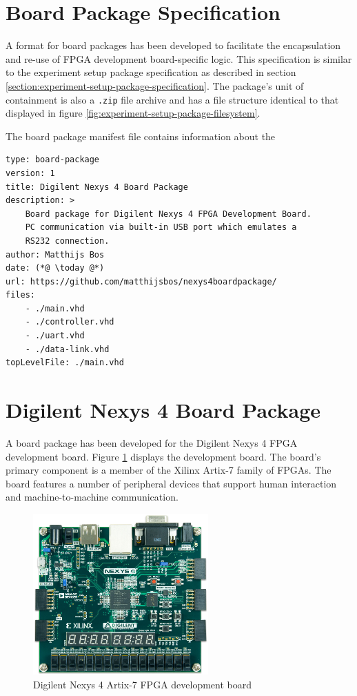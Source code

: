 \documentclass[main.tex]{subfiles}
\begin{document}
\section{Board Package Specification}
A format for board packages has been developed to facilitate the encapsulation and re-use of FPGA development board-specific logic. This specification is similar to the experiment setup package specification as described in section \ref{section:experiment-setup-package-specification}. The package's unit of containment is also a \texttt{.zip} file archive and has a file structure identical to that displayed in figure \ref{fig:experiment-setup-package-filesystem}. 

The board package manifest file contains information about the 

\begin{lstlisting}[caption={Example board package \texttt{manifest.yaml}}, label={lst:board-package-manifest}]
type: board-package
version: 1
title: Digilent Nexys 4 Board Package
description: >
    Board package for Digilent Nexys 4 FPGA Development Board. 
    PC communication via built-in USB port which emulates a
    RS232 connection.
author: Matthijs Bos
date: (*@ \today @*)
url: https://github.com/matthijsbos/nexys4boardpackage/
files: 
    - ./main.vhd
    - ./controller.vhd
    - ./uart.vhd
    - ./data-link.vhd
topLevelFile: ./main.vhd

\end{lstlisting}

\section{Digilent Nexys 4 Board Package}
A board package has been developed for the Digilent Nexys 4 FPGA development board. Figure \ref{fig:nexys4} displays the development board. The board's primary component is a member of the Xilinx Artix-7 family of FPGAs. The board features a number of peripheral devices that support human interaction and machine-to-machine communication. 

\begin{figure}[h]
\centering
\includegraphics[width=0.6\textwidth]{img/nexys4-small}
\caption{Digilent Nexys 4 Artix-7 FPGA development board}
\label{fig:nexys4}
\end{figure}
\end{document}
